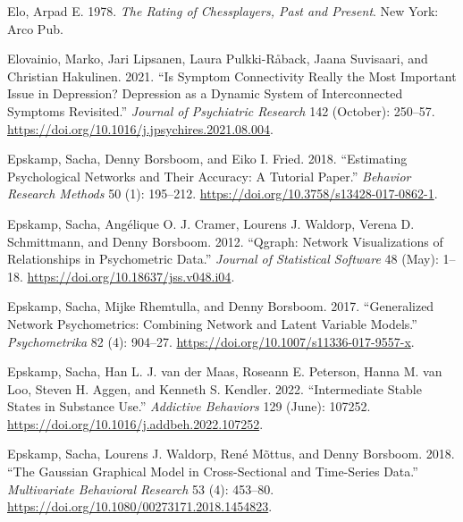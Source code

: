 \documentclass[
  a4paper,
  DIV=11,
  numbers=noendperiod,
  oneside]{scrreprt}
\newlength{\cslhangindent}
\newlength{\cslentryspacingunit} %
\newenvironment{CSLReferences}[2] %
 {%
  \setlength{\parindent}{0pt}
  \ifodd #1
  \let\oldpar\par
  \def\par{\hangindent=\cslhangindent\oldpar}
  \fi
  \setlength{\parskip}{#2\cslentryspacingunit}
 }%
 {}
\begin{document}
\begin{CSLReferences}{1}{0}
\leavevmode{}%
Elo, Arpad E. 1978. \emph{The Rating of Chessplayers, Past and Present}.
{New York}: {Arco Pub}.

\leavevmode{}%
Elovainio, Marko, Jari Lipsanen, Laura Pulkki-Råback, Jaana Suvisaari,
and Christian Hakulinen. 2021. {``Is Symptom Connectivity Really the
Most Important Issue in Depression? {Depression} as a Dynamic System of
Interconnected Symptoms Revisited.''} \emph{Journal of Psychiatric
Research} 142 (October): 250--57.
\url{https://doi.org/10.1016/j.jpsychires.2021.08.004}.

\leavevmode{}%
Epskamp, Sacha, Denny Borsboom, and Eiko I. Fried. 2018. {``Estimating
Psychological Networks and Their Accuracy: {A} Tutorial Paper.''}
\emph{Behavior Research Methods} 50 (1): 195--212.
\url{https://doi.org/10.3758/s13428-017-0862-1}.

\leavevmode{}%
Epskamp, Sacha, Angélique O. J. Cramer, Lourens J. Waldorp, Verena D.
Schmittmann, and Denny Borsboom. 2012. {``Qgraph: {Network
Visualizations} of {Relationships} in {Psychometric Data}.''}
\emph{Journal of Statistical Software} 48 (May): 1--18.
\url{https://doi.org/10.18637/jss.v048.i04}.

\leavevmode{}%
Epskamp, Sacha, Mijke Rhemtulla, and Denny Borsboom. 2017.
{``Generalized {Network Psychometrics}: {Combining Network} and {Latent
Variable Models}.''} \emph{Psychometrika} 82 (4): 904--27.
\url{https://doi.org/10.1007/s11336-017-9557-x}.

\leavevmode{}%
Epskamp, Sacha, Han L. J. van der Maas, Roseann E. Peterson, Hanna M.
van Loo, Steven H. Aggen, and Kenneth S. Kendler. 2022. {``Intermediate
Stable States in Substance Use.''} \emph{Addictive Behaviors} 129
(June): 107252. \url{https://doi.org/10.1016/j.addbeh.2022.107252}.

\leavevmode{}%
Epskamp, Sacha, Lourens J. Waldorp, René Mõttus, and Denny Borsboom.
2018. {``The {Gaussian Graphical Model} in {Cross-Sectional} and
{Time-Series Data}.''} \emph{Multivariate Behavioral Research} 53 (4):
453--80. \url{https://doi.org/10.1080/00273171.2018.1454823}.


\end{CSLReferences}
\end{document}
